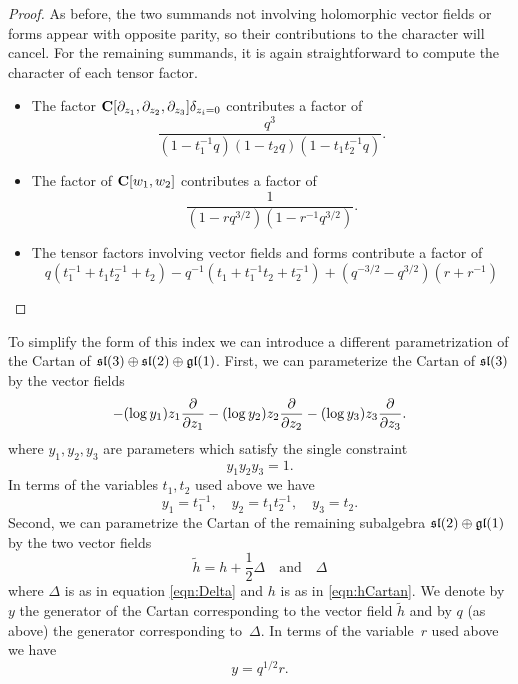 \documentclass[../main.tex]{subfiles}
\begin{document}
\begin{proof}
As before, the two summands not involving holomorphic vector fields or forms appear with opposite parity, so their contributions to the character will cancel. For the remaining summands, it is again straightforward to compute the character of each tensor factor.
\begin{itemize}
\item The factor $\mathbf{C}[\partial_{z_1}, \partial_{z_2}, \partial_{z_3}]\delta_{z_i=0}$ contributes a factor of \[ \frac{q^3}{(1-t_{1}^{-1}q)(1-t_{2}q)(1-t_{1}t_{2}^{-1}q)}.\]
\item The factor of $\mathbf{C}[w_1, w_2]$ contributes a factor of \[ \frac{1}{(1-rq^{3/2})(1-r^{-1}q^{3/2})}.\]
\item The tensor factors involving vector fields and forms contribute a factor of \[ q(t_1^{-1}+t_1t_2^{-1}+t_2)-q^{-1}(t_1+t_1^{-1}t_2+t_2^{-1})+(q^{-3/2}-q^{3/2})(r+r^{-1})\] 
\end{itemize}
\end{proof}

\parsec{}
To simplify the form of this index we can introduce a different parametrization of the Cartan of $\mathfrak{sl}(3) \oplus \mathfrak{sl}(2) \oplus \mathfrak{gl}(1)$.
First, we can parameterize the Cartan of $\mathfrak{sl}(3)$ by the vector fields
  \begin{equation}\label{eqn:ys}
  -(\log y_1) z_1 \frac{\partial}{\partial {z_1}} - (\log y_2) z_2 \frac{\partial}{\partial{z_2}} - (\log y_3) z_3 \frac{\partial}{\partial{z_3}} .
  \end{equation}
where $y_1,y_2,y_3$ are parameters which satisfy the single constraint
\begin{equation}
y_1 y_2 y_3 = 1 .
\end{equation}
In terms of the variables $t_1,t_2$ used above we have
\begin{equation}
y_1 = t_1^{-1},\quad y_2 = t_1 t_2^{-1}, \quad y_3 = t_2 .
\end{equation}
Second, we can parametrize the Cartan of the remaining subalgebra $\mathfrak{sl}(2) \oplus \mathfrak{gl}(1)$ by the two vector fields
\begin{equation}
\tilde{h} = h + \frac12 \Delta \quad \text{and} \quad \Delta
\end{equation}
where $\Delta$ is as in equation \eqref{eqn:Delta} and $h$ is as in \eqref{eqn:hCartan}.
We denote by $y$ the generator of the Cartan corresponding to the vector field $\tilde{h}$ and by $q$ (as above) the generator corresponding to~$\Delta$.
In terms of the variable~$r$ used above we have 
\begin{equation}
y = q^{1/2} r .
\end{equation}
\end{document}
